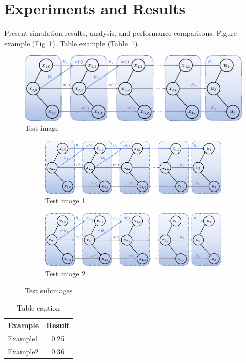 \section{Experiments and Results}
Present simulation results, analysis, and performance comparisons. 
Figure example (Fig~\ref{F:test-a}).
Table example (Table~\ref{table}).

\begin{figure}[htb]
    \centering
    \includegraphics[width=.5\textwidth]{Images/example.png}
    \caption{Test image}
    \label{F:test-a}
\end{figure}

\begin{figure}[htb]
    \centering
    \begin{subfigure}[t]{.45\linewidth}
        \centering
        \includegraphics[width=1\textwidth]{Images/example.png}
        \caption{Test image 1}
        \label{F:test-b-sub-a}
    \end{subfigure}
    \hfill
    \begin{subfigure}[t]{.45\linewidth}
        \centering
        \includegraphics[width=1\textwidth]{Images/example.png}
        \caption{Test image 2}
        \label{F:test-b-sub-b}
    \end{subfigure}
    \caption{Test subimages}
    \label{F:test-b}
\end{figure}

\begin{table}[htb]  %
    \settablefont
    \caption{Table caption}
    \label{table}
    \begin{tabular}{lc} %
        \toprule  %
        Example    &   Result \\
        \midrule  %
        Example1   &   0.25 \\
        Example2   &   0.36 \\
        \bottomrule   %
    \end{tabular}  %
\end{table}

